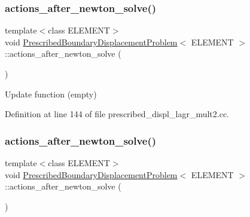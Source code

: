 \subsubsection{\texorpdfstring{actions\+\_\+after\+\_\+newton\+\_\+solve()}{actions\_after\_newton\_solve()}\hspace{0.1cm}{\footnotesize\ttfamily [1/3]}}
{\footnotesize\ttfamily template$<$class E\+L\+E\+M\+E\+NT$>$ \\
void \hyperlink{classPrescribedBoundaryDisplacementProblem}{Prescribed\+Boundary\+Displacement\+Problem}$<$ E\+L\+E\+M\+E\+NT $>$\+::actions\+\_\+after\+\_\+newton\+\_\+solve (\begin{DoxyParamCaption}{ }\end{DoxyParamCaption})\hspace{0.3cm}{\ttfamily [inline]}}



Update function (empty) 



Definition at line 144 of file prescribed\+\_\+displ\+\_\+lagr\+\_\+mult2.\+cc.

\mbox{\label{classPrescribedBoundaryDisplacementProblem_a53e7d18d9d748388160d6c4106f1d493}} 
\subsubsection{\texorpdfstring{actions\+\_\+after\+\_\+newton\+\_\+solve()}{actions\_after\_newton\_solve()}\hspace{0.1cm}{\footnotesize\ttfamily [2/3]}}
{\footnotesize\ttfamily template$<$class E\+L\+E\+M\+E\+NT$>$ \\
void \hyperlink{classPrescribedBoundaryDisplacementProblem}{Prescribed\+Boundary\+Displacement\+Problem}$<$ E\+L\+E\+M\+E\+NT $>$\+::actions\+\_\+after\+\_\+newton\+\_\+solve (\begin{DoxyParamCaption}{ }\end{DoxyParamCaption})\hspace{0.3cm}{\ttfamily [inline]}}



